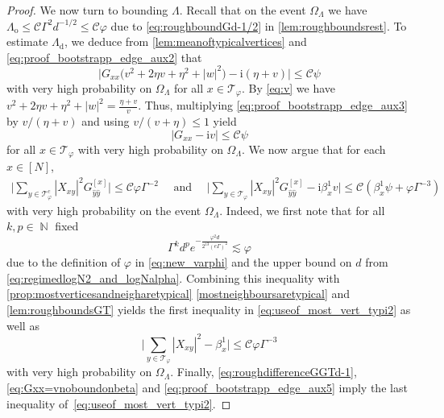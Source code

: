 \documentclass[11pt]{article}
\DeclareMathOperator{\NN}{\mathbb{N}}
\newcommand{\ii}{\mathrm{i}}
\newcommand{\abs}[1]{\left| #1 \right|}
\theoremstyle{plain}
\theoremstyle{remark}
\numberwithin{equation}{section}
\newcommand*\bset[1]{[#1]}
\newcommand*\ubarr[1]{{\widehat{#1}}}
\begin{document}
\begin{proof}
		We now turn to bounding $\Lambda$. 
		Recall that on the event $\Omega_{\Lambda}$ we have $\Lambda_{\mathrm{o}} \le \mathcal{C} \Gamma^2 d^{-1/2}\le \mathcal C \varphi $ due to \cref{eq:roughboundGd-1/2} in \cref{lem:roughboundsrest}. 
		To estimate $\Lambda_\mathrm{d}$, we deduce from \cref{lem:meanoftypicalvertices} and \eqref{eq:proof_bootstrapp_edge_aux2} that 
		\begin{equation}\label{eq:proof_bootstrapp_edge_aux3} 
			\big|G_{xx} \bigl( v^2  +2 \eta v + \eta^2 + \abs{w}^2 \bigr) -  \ii (\eta + v) \big| \le  \mathcal{C}\psi
		\end{equation}
		with very high probability on $\Omega_\Lambda$ for all $x \in \mathcal{T}_{\varphi}$. 
		By \eqref{eq:v} we have $v^2  +2 \eta v + \eta^2 + \abs{w}^2= \frac{\eta +v}{v}$. 
		Thus, multiplying \eqref{eq:proof_bootstrapp_edge_aux3} by $v/(\eta+ v)$ and using $v/(v+ \eta) \le 1$ yield 
		\begin{equation}\label{eq:Gxx=vnoboundonbeta}
			|G_{xx} - \ii v | \le \mathcal C  \psi
		\end{equation} 
 for all $x \in \mathcal T_\varphi$ with very high probability on $\Omega_{\Lambda}$. We now argue that for each $x \in [N]$, 
		\begin{align}\label{eq:useof_most_vert_typi2}
			\bigg|\sum_{y\in \mathcal{T}_{\varphi}^c} \abs{X_{xy}}^2 G_{\ubarr{y}\ubarr{y}}^{\bset{x}}\bigg| \le  \mathcal{C} \varphi \Gamma^{-2}  \quad \text{ and }\quad \bigg|\sum_{y\in \mathcal{T}_{\varphi}}\abs{X_{xy}}^2 G_{\ubarr{y}\ubarr{y}}^{\bset{x}} -\ii \beta_x^{1}v \bigg| \le  \mathcal{C} ( \beta_x^1 \psi + \varphi \Gamma^{-3}) 
		\end{align}
	with very high probability on the event $\Omega_{\Lambda}$. Indeed, we first note that for all $k,p \in \NN$ fixed 
	\begin{equation}\label{eq:bound_Gamma_non_typic}
	  \Gamma^k  d^p e^{-\frac{\varphi^2d}{2^{13} (e\Gamma)^2}} \lesssim \varphi
	 	\end{equation}
due to the definition of $\varphi$ in \cref{eq:new_varphi} and the upper bound on $d$ from \cref{eq:regimedlogN2_and_logNalpha}. 
		Combining this inequality with 	\cref{prop:mostverticesandneigharetypical} \cref{mostneighboursaretypical} and \cref{lem:roughboundsGT}
		yields the first inequality in \eqref{eq:useof_most_vert_typi2} as well as 
		\begin{equation} \label{eq:proof_bootstrapp_edge_aux5} 
			\bigg|\sum_{y\in \mathcal{T}_{\varphi}} \abs{X_{xy}}^2 - \beta_{x}^1 \bigg|\le  \mathcal{C} \varphi  \Gamma^{-3} 
		\end{equation} 
		with very high probability on $\Omega_\Lambda$. 
		Finally, \eqref{eq:roughdifferenceGGTd-1}, \eqref{eq:Gxx=vnoboundonbeta} and \eqref{eq:proof_bootstrapp_edge_aux5}  imply the last inequality of~\eqref{eq:useof_most_vert_typi2}.  
		

\end{proof}
\end{document}
